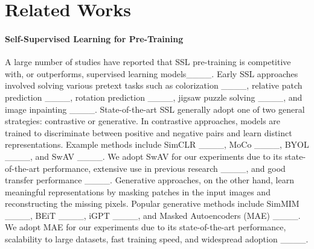 \section{Related Works}
\label{sec:related-works}

\paragraph{Self-Supervised Learning for Pre-Training}
A large number of studies have reported that SSL pre-training is competitive with, or outperforms, supervised learning models____.  Early SSL approaches involved solving various pretext tasks such as colorization ____, relative patch prediction ____, rotation prediction ____, jigsaw puzzle solving ____, and image inpainting ____. State-of-the-art SSL generally adopt one of two general strategies: contrastive or generative.  In contrastive approaches, models are trained to discriminate between positive and negative pairs and learn distinct representations.  Example methods include SimCLR ____, MoCo ____, BYOL ____, and SwAV ____.  We adopt SwAV for our experiments due to its state-of-the-art performance, extensive use in previous research ____, and good transfer performance ____. Generative approaches, on the other hand, learn meaningful representations by masking patches in the input images and reconstructing the missing pixels. Popular generative methods include SimMIM ____, BEiT ____, iGPT ____, and Masked Autoencoders (MAE) ____. We adopt MAE for our experiments due to its state-of-the-art performance, scalability to large datasets, fast training speed, and widespread adoption ____.

